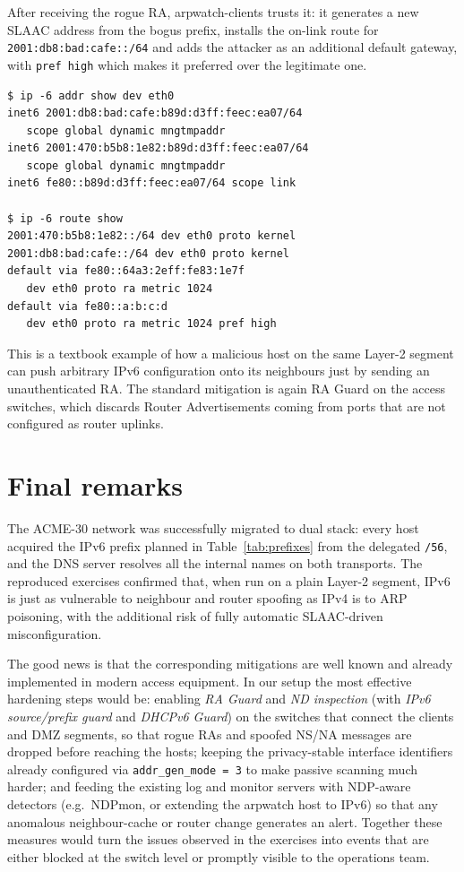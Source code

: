 \documentclass[twocolumn]{NobArticle}
\begin{document}
After receiving the rogue RA, arpwatch-clients trusts it: it generates a
new SLAAC address from the bogus prefix, installs the on-link route for
\texttt{2001:db8:bad:cafe::/64} and adds the attacker as an additional
default gateway, with \texttt{pref high} which makes it preferred over the
legitimate one.

\begin{lstlisting}
$ ip -6 addr show dev eth0
inet6 2001:db8:bad:cafe:b89d:d3ff:feec:ea07/64
   scope global dynamic mngtmpaddr
inet6 2001:470:b5b8:1e82:b89d:d3ff:feec:ea07/64
   scope global dynamic mngtmpaddr
inet6 fe80::b89d:d3ff:feec:ea07/64 scope link

$ ip -6 route show
2001:470:b5b8:1e82::/64 dev eth0 proto kernel
2001:db8:bad:cafe::/64 dev eth0 proto kernel
default via fe80::64a3:2eff:fe83:1e7f
   dev eth0 proto ra metric 1024
default via fe80::a:b:c:d
   dev eth0 proto ra metric 1024 pref high
\end{lstlisting}

This is a textbook example of how a malicious host on the same Layer-2
segment can push arbitrary IPv6 configuration onto its neighbours just by
sending an unauthenticated RA. The standard mitigation is again RA Guard
on the access switches, which discards Router Advertisements coming from
ports that are not configured as router uplinks.

\section{Final remarks}

The ACME-30 network was successfully migrated to dual stack: every host
acquired the IPv6 prefix planned in Table~\ref{tab:prefixes} from the
delegated \texttt{/56}, and the DNS server resolves all the internal names
on both transports. The reproduced exercises confirmed that, when run on a
plain Layer-2 segment, IPv6 is just as vulnerable to neighbour and router
spoofing as IPv4 is to ARP poisoning, with the additional risk of fully
automatic SLAAC-driven misconfiguration.

The good news is that the corresponding mitigations are well known and
already implemented in modern access equipment. In our setup the most
effective hardening steps would be: enabling \textit{RA Guard} and
\textit{ND inspection} (with \textit{IPv6 source/prefix guard} and
\textit{DHCPv6 Guard}) on the switches that connect the clients and DMZ
segments, so that rogue RAs and spoofed NS/NA messages are dropped before
reaching the hosts; keeping the privacy-stable interface identifiers
already configured via \texttt{addr\_gen\_mode = 3} to make passive
scanning much harder; and feeding the existing log and monitor servers
with NDP-aware detectors (e.g.\ NDPmon, or extending the arpwatch host
to IPv6) so that any anomalous neighbour-cache or router change generates
an alert. Together these measures would turn the issues observed in the
exercises into events that are either blocked at the switch level or
promptly visible to the operations team.
\end{document}
